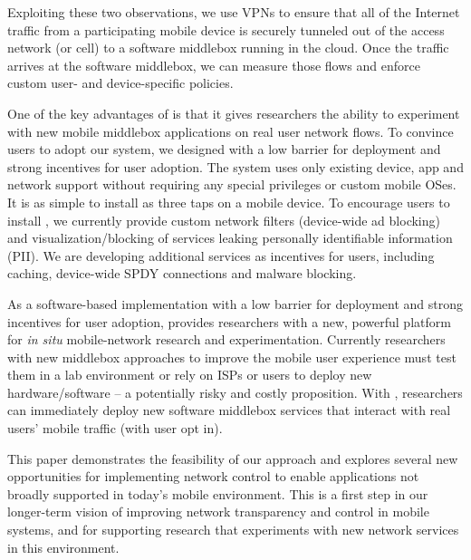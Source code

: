 Exploiting these two observations, we use VPNs to ensure that all of the Internet traffic from a participating mobile device is 
securely tunneled out of the access network (\wifi or cell) to a software middlebox running 
in the cloud. Once the traffic arrives at the software middlebox, we can measure those flows 
and enforce custom user- and device-specific policies. 

One of the key advantages of \meddle is that it gives researchers the ability to experiment 
with new mobile middlebox applications on real user network flows. To convince users to adopt our 
system, we designed \meddle with a low barrier for deployment and strong incentives for 
user adoption. The system uses only existing device, app and network support without requiring 
any special privileges or custom mobile OSes. It is as simple to install as three taps 
on a mobile device. To encourage users to install \meddle, we currently provide custom 
network filters (\eg device-wide ad blocking) and visualization/blocking of services leaking 
personally identifiable information (PII). We are developing additional services as incentives 
for users, including caching, device-wide SPDY connections and malware blocking.

As a software-based implementation with a low barrier for deployment and strong incentives for 
user adoption, \meddle provides researchers with a new, powerful platform for \emph{in situ} 
mobile-network research and experimentation. Currently researchers with new  
middlebox approaches to improve the mobile user experience must test them in a lab environment or 
rely on ISPs or users to deploy new hardware/software -- a potentially risky and costly 
proposition. With \meddle, researchers 
can immediately deploy new software middlebox services that interact with 
real users' mobile traffic (with user opt in). %

This paper demonstrates the feasibility of our approach and explores several new opportunities 
for implementing network control to enable applications not broadly supported in today's mobile 
environment. This is a first step in our longer-term vision of improving network transparency and control 
in mobile systems, and for supporting research that experiments with new network services 
in this environment.

